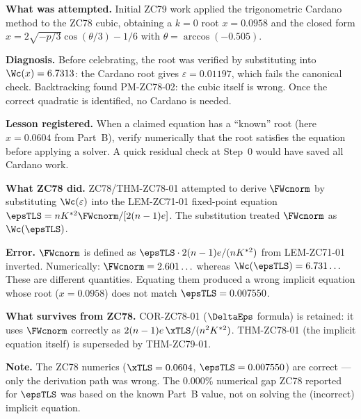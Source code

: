 \documentclass[12pt, a4paper]{article}
\begin{document}
\begin{openqbox}[title={PM-ZC79-01: Cardano Attempted Before Root
  Verification (pattern: probe malformed)}]

\textbf{What was attempted.}
Initial ZC79 work applied the trigonometric Cardano method
to the ZC78 cubic, obtaining a $k=0$ root $x = 0.0958$
and the closed form
$x = 2\sqrt{-p/3}\cos(\theta/3) - 1/6$
with $\theta = \arccos(-0.505)$.

\textbf{Diagnosis.}
Before celebrating, the root was verified by substituting into
$\Wc(x) = 6.7313$: the Cardano root gives $\varepsilon = 0.01197$,
which fails the canonical check.
Backtracking found PM-ZC78-02: the cubic itself is wrong.
Once the correct quadratic is identified, no Cardano is needed.

\textbf{Lesson registered.}
When a claimed equation has a ``known'' root (here $x = 0.0604$
from Part~B), verify numerically that the root satisfies the
equation before applying a solver.
A quick residual check at Step~0 would have saved all Cardano work.
\end{openqbox}

\begin{openqbox}[title={PM-ZC78-02: ZC78 Implicit Equation Derivation
  Error --- Retroactive Scar (pattern: probe malformed)}]

\textbf{What ZC78 did.}
ZC78/THM-ZC78-01 attempted to derive $\FWcnorm$ by substituting
$\Wc(\varepsilon)$ into the LEM-ZC71-01 fixed-point equation
$\epsTLS = nK^{*2}\FWcnorm/[2(n-1)e]$.
The substitution treated $\FWcnorm$ as $\Wc(\epsTLS)$.

\textbf{Error.}
$\FWcnorm$ is defined as $\epsTLS \cdot 2(n-1)e/(nK^{*2})$
from LEM-ZC71-01 inverted.
Numerically: $\FWcnorm = 2.601\ldots$
whereas $\Wc(\epsTLS) = 6.731\ldots$
These are different quantities. Equating them produced
a wrong implicit equation whose root ($x = 0.0958$)
does not match $\epsTLS = 0.007550$.

\textbf{What survives from ZC78.}
COR-ZC78-01 ($\DeltaEps$ formula) is retained: it uses
$\FWcnorm$ correctly as $2(n-1)e\,\xTLS/(n^2K^{*2})$.
THM-ZC78-01 (the implicit equation itself) is superseded
by THM-ZC79-01.

\textbf{Note.}
The ZC78 numerics ($\xTLS = 0.0604$, $\epsTLS = 0.007550$)
are correct --- only the derivation path was wrong.
The $0.000\%$ numerical gap ZC78 reported for $\epsTLS$
was based on the known Part~B value, not on solving the
(incorrect) implicit equation.
\end{openqbox}
\end{document}
